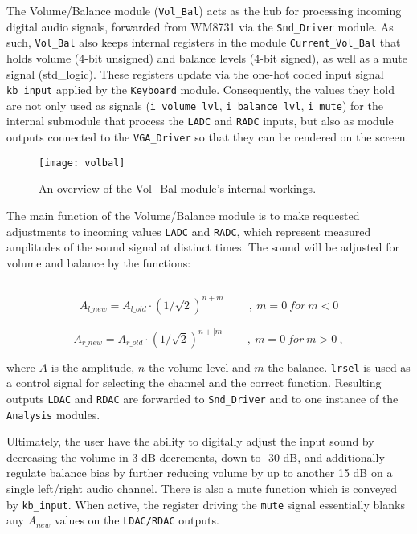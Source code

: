 The Volume/Balance module (\verb=Vol_Bal=) acts as the hub for processing incoming digital audio signals, forwarded from WM8731 via the \verb=Snd_Driver= module. As such, \verb=Vol_Bal= also keeps internal registers in the module \verb=Current_Vol_Bal= that holds volume (4-bit unsigned) and balance levels (4-bit signed), as well as a mute signal (std\_logic). These registers update via the one-hot coded input signal \verb=kb_input= applied by the \verb=Keyboard= module. Consequently, the values they hold are not only used as signals (\verb=i_volume_lvl=, \verb=i_balance_lvl=, \verb=i_mute=) for the internal submodule that process the \verb=LADC= and \verb=RADC= inputs, but also as module outputs connected to the \verb=VGA_Driver= so that they can be rendered on the screen.

\begin{figure}[H]
  \centering
  \texttt{[image: volbal]}
  \caption{An overview of the Vol\_Bal module's internal workings.}
  \label{fig:vol_bal}
\end{figure}

The main function of the Volume/Balance module is to make requested adjustments to incoming values \verb=LADC= and \verb=RADC=, which represent measured amplitudes of the sound signal at distinct times. The sound will be adjusted for volume and balance by the functions:

\verb=   =$$A_{l\_new} = A_{l\_old} \cdot (1/\sqrt{2})^{n + m}\qquad\ ,\ m = 0\ for\ m < 0$$
\verb=   =$$A_{r\_new} = A_{r\_old} \cdot (1/\sqrt{2})^{n + |m|}\qquad,\ m = 0\ for\ m > 0\ ,$$

where $A$ is the amplitude, $n$ the volume level and $m$ the balance. \verb=lrsel= is used as a control signal for selecting the channel and the correct function. Resulting outputs \verb=LDAC= and \verb=RDAC= are forwarded to \verb=Snd_Driver= and to one instance of the \verb=Analysis= modules.

Ultimately, the user have the ability to digitally adjust the input sound by decreasing the volume in 3 dB decrements, down to -30 dB, and additionally regulate balance bias by further reducing volume by up to another 15 dB on a single left/right audio channel. There is also a mute function which is conveyed by \verb=kb_input=. When active, the register driving the \verb=mute= signal essentially blanks any $A_{new}$ values on the \verb=LDAC/RDAC= outputs.



